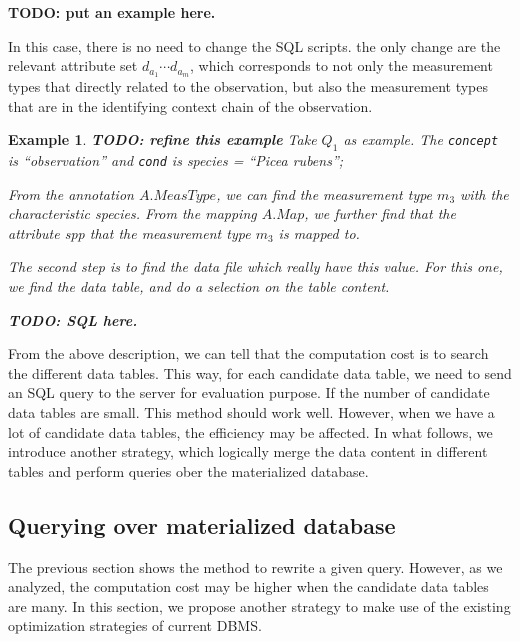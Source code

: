 \documentclass[conference]{IEEEtran}
\newtheorem{example}{Example}[section]
\begin{document}
{\bf TODO: put an example here.}

In this case, there is no need to change the SQL scripts.
the only change are the relevant attribute set $d_{a_1} \cdots
d_{a_m}$, which corresponds to not only the measurement types that
directly related to the observation, but also the measurement types
that are in the identifying context chain of the observation. 

\begin{example}\label{eg:query_reqerite_q1}
{\bf TODO: refine this example} 
Take $Q_1$ as example. The {\tt concept} is ``observation'' and {\tt cond} is {\em species = ``Picea rubens''}; 

From the annotation $A.MeasType$, we can find the measurement type
$m_3$ with the characteristic {\em species}. 
From the mapping $A.Map$, we further find that the attribute {\em spp} that the
measurement type $m_3$ is mapped to. 

The second step is to find the data file which really have this value. 
For this one, we find the data table, and do a selection on the table
content. 

{\bf TODO: SQL here.} 
\end{example}

From the above description, we can tell that the computation cost is to search the different data
tables. This way, for each candidate data table, we need to send an
SQL query to the server for evaluation purpose.
If the number of candidate data tables are small. This method should
work well. However, when we have a lot of candidate data tables, the
efficiency may be affected. 
In what follows, we introduce another strategy, which logically merge
the data content in different tables and perform queries ober the
materialized database. 

\subsection{Querying over materialized database}\label{sec:matdb}

The previous section shows the method to rewrite a given query. 
However, as we analyzed, the computation cost may be higher when the
candidate data tables are many. In this section, we propose another
strategy to make use of the existing optimization strategies of
current DBMS. 
\end{document}
